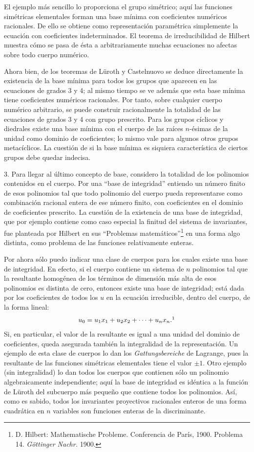 \documentclass[11pt]{article}
\begin{document}
El ejemplo más sencillo lo proporciona el grupo simétrico; aquí las funciones simétricas elementales forman una base mínima con coeficientes numéricos racionales. De ello se obtiene como representación paramétrica simplemente la ecuación con coeficientes indeterminados. El teorema de irreducibilidad de Hilbert muestra cómo se pasa de ésta a arbitrariamente muchas ecuaciones no afectas sobre todo cuerpo numérico.

Ahora bien, de los teoremas de Lüroth y Castelnuovo se deduce directamente la existencia de la base mínima para todos los grupos que aparecen en las ecuaciones de grados 3 y 4; al mismo tiempo se ve además que esta base mínima tiene coeficientes numéricos racionales. Por tanto, sobre cualquier cuerpo numérico arbitrario, se puede construir racionalmente la totalidad de las ecuaciones de grados 3 y 4 con grupo prescrito. Para los grupos cíclicos y diedrales existe una base mínima con el cuerpo de las raíces $n$-ésimas de la unidad como dominio de coeficientes; lo mismo vale para algunos otros grupos metacíclicos. La cuestión de si la base mínima es siquiera característica de ciertos grupos debe quedar indecisa.

3. Para llegar al último concepto de base, considero la totalidad de los polinomios contenidos en el cuerpo. Por una ``base de integridad'' entiendo un número finito de esos polinomios tal que todo polinomio del cuerpo pueda representarse como combinación racional entera de ese número finito, con coeficientes en el dominio de coeficientes prescrito. La cuestión de la existencia de una base de integridad, que por ejemplo contiene como caso especial la finitud del sistema de invariantes, fue planteada por Hilbert en sus ``Problemas matemáticos''\footnote{D. Hilbert: Mathematische Probleme. Conferencia de París, 1900. Problema 14. \emph{Göttinger Nachr.} 1900.} en una forma algo distinta, como problema de las funciones relativamente enteras.

Por ahora sólo puedo indicar una clase de cuerpos para los cuales existe una base de integridad. En efecto, si el cuerpo contiene un sistema de $n$ polinomios tal que la resultante homogénea de los términos de dimensión más alta de esos polinomios es distinta de cero, entonces existe una base de integridad; está dada por los coeficientes de todos los $u$ en la ecuación irreducible, dentro del cuerpo, de la forma lineal:
\[
  u_0=u_1x_1+u_2x_2+\cdots+u_nx_n.\footnotemark
\]
Si, en particular, el valor de la resultante es igual a una unidad del dominio de coeficientes, queda asegurada también la integralidad de la representación. Un ejemplo de esta clase de cuerpos lo dan los \emph{Gattungsbereiche} de Lagrange, pues la resultante de las funciones simétricas elementales tiene el valor $\pm 1$. Otro ejemplo (sin integralidad) lo dan todos los cuerpos que contienen sólo un polinomio algebraicamente independiente; aquí la base de integridad es idéntica a la función de Lüroth del subcuerpo más pequeño que contiene todos los polinomios. Así, como es sabido, todos los invariantes proyectivos racionales enteros de una forma cuadrática en $n$ variables son funciones enteras de la discriminante.
\end{document}
